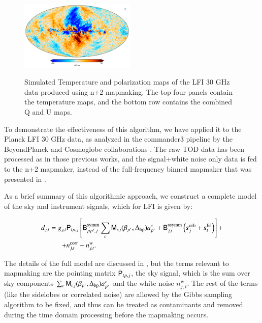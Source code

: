 \documentclass{aa}
\begin{document}
\begin{figure}
  \includegraphics[width=0.49\textwidth]{figs/sim_U.pdf}\\
  \caption{Simulated Temperature and polarization maps of the LFI 30 GHz data produced using n+2 mapmaking. The top four panels contain the temperature maps, and the bottom row contains the combined Q and U maps.}
  \label{fig:sim}
\end{figure}


To demonstrate the effectiveness of this algorithm, we have applied it to the Planck LFI 30 GHz data, as analyzed in the commander3 pipeline by the BeyondPlanck and Cosmoglobe collaborations \citep{bp01, watts2023_dr1}. The raw TOD data has been processed as in those previous works, and the signal+white noise only data is fed to the n+2 mapmaker, instead of the full-frequency binned mapmaker that was presented in \citet{BP10}. 

As a brief summary of this algorithmic approach, we construct a complete model of the sky and instrument signals, which for LFI is given by:

\begin{equation}
  \begin{split}
    d_{j,t} = g_{j,t}&\mathsf{P}_{tp,j}\left[\mathsf{B}^{\mathrm{symm}}_{pp',j}\sum_{c}
      \mathsf{M}_{cj}(\beta_{p'}, \Delta_{\mathrm{bp}})a^c_{p'}  + \mathsf{B}^{\mathrm{asymm}}_{j,t}\left(\boldsymbol{s}^{\mathrm{orb}}_{j}  
      + \boldsymbol{s}^{\mathrm{fsl}}_{t}\right)\right] + \\
    + &n^{\mathrm{corr}}_{j,t} + n^{\mathrm{w}}_{j,t}.
  \end{split}
  \label{eq:todmodel}
\end{equation}

The details of the full model are discussed in \citep{bp01}, but the terms relevant to mapmaking are the pointing matrix $\mathsf{P}_{tp,j}$, the sky signal, which is the sum over sky components $\sum_{c} \mathsf{M}_{cj}(\beta_{p'}, \Delta_{\mathrm{bp}})a^c_{p'}$ and the white noise $n^{\mathrm{w}}_{j,t}$. The rest of the terms (like the sidelobes or correlated noise) are allowed by the Gibbs sampling algorithm \citep{gibbs} to be fixed, and thus can be treated as contaminants and removed during the time domain processing before the mapmaking occurs. 
\end{document}
